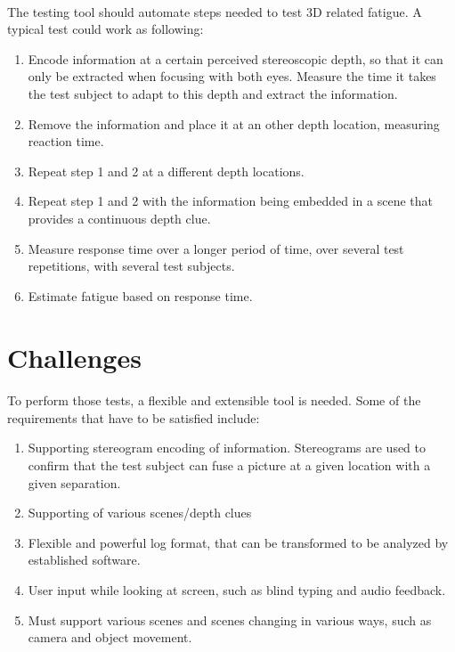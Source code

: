\documentclass[11pt]{scrartcl}
\begin{document}
\begin{multicols}{2}
\paragraph{}
The testing tool should automate steps needed to test 3D related fatigue. A typical test could work as following:

\begin{enumerate}
\item Encode information at a certain perceived stereoscopic depth, so that it can only be extracted when focusing with both eyes. Measure the time it takes the test subject to adapt to this depth and extract the information.
\item Remove the information and place it at an other depth location, measuring reaction time.
\item Repeat step 1 and 2 at a different depth locations.
\item Repeat step 1 and 2 with the information being embedded in a scene that provides a continuous depth clue.
\item Measure response time over a longer period of time, over several test repetitions, with several test subjects.
\item Estimate fatigue based on response time.
\end{enumerate}

\section{Challenges}
\paragraph{}
To perform those tests, a flexible and extensible tool is needed. Some of the requirements that have to be satisfied include:

\begin{enumerate}
\item Supporting stereogram encoding of information. Stereograms are used to confirm that the test subject can fuse a picture at a given location with a given separation.
\item Supporting of various scenes/depth clues
\item Flexible and powerful log format, that can be transformed to be analyzed by established software.
\item User input while looking at screen, such as blind typing and audio feedback.
\item Must support various scenes and scenes changing in various ways, such as camera and object movement.
\end{enumerate}


\end{multicols}
\end{document}
